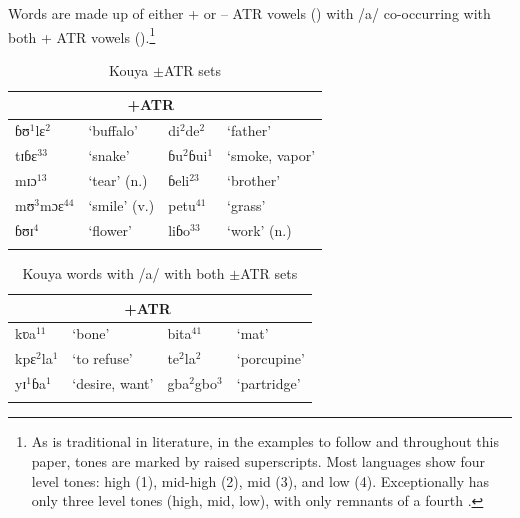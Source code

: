 \documentclass[output=paper
,newtxmath
,modfonts
,nonflat]{langsci/langscibook}
\begin{document}
 Words are made up of either + or – ATR vowels () with /a/ co-occurring with both + ATR vowels ().\footnote{As is traditional in  literature, in the examples to follow and throughout this paper, tones are marked by raised superscripts. Most  languages show four level tones: high (1), mid-high (2), mid (3), and low (4).  Exceptionally  has only three level tones (high, mid, low), with only remnants of a fourth  \citep{Gratrix1975}.} 

\begin{table} %

		\caption{Kouya $\pm$ATR sets}     \label{tab:zogbo:2a}
\begin{tabular}{llll}

\lsptoprule
\multicolumn{2}{c}{-ATR} & \multicolumn{2}{c}{+ATR}\\
\midrule
{ɓʊ}{$^1$}{l}ɛ$^2$ &     {‘buffalo’} & {di}$^2${de}$^2$ & {‘father’}\\

{t}ɪɓɛ$^{33}$  &  ‘snake’   &   ɓ{u}$^2$ɓui$^1$ & {‘smoke,  vapor’}\\

mɪɔ$^{13}$  &  ‘tear’ (n.) &    ɓeli$^{23}$  &  ‘brother’ \\

m{ʊ}{$^3$}{m}ɔɛ$^{44}$ & ‘smile’ (v.)  &  petu$^{41}$  &  ‘grass’ \\

ɓʊɪ$^4$ & ‘flower’  &  liɓo$^{33}$    & ‘work’ (n.) \\
\lspbottomrule
\end{tabular}
\end{table}



\begin{table}
\caption{Kouya words with /a/ with both $\pm$ATR sets}
\label{tab:zogbo:2b}
  
\begin{tabular}{llll}

\lsptoprule
\multicolumn{2}{c}{-ATR}     &     \multicolumn{2}{c}{+ATR}\\
\midrule
kʋa$^{11}$  &  ‘bone’   &   bita$^{41}$  &  ‘mat’\\

{kp}ɛ$^2${l}a$^1$ & {‘to refuse’}   &   te$^2$la$^2$  &  ‘porcupine’\\

  yɪ$^1$ɓa$^1$ &  ‘desire, want’ & {gb}a$^2${gb}o$^3$ & {  ‘partridge’}\\ 
  \lspbottomrule
\end{tabular}
\end{table}
\end{document}
